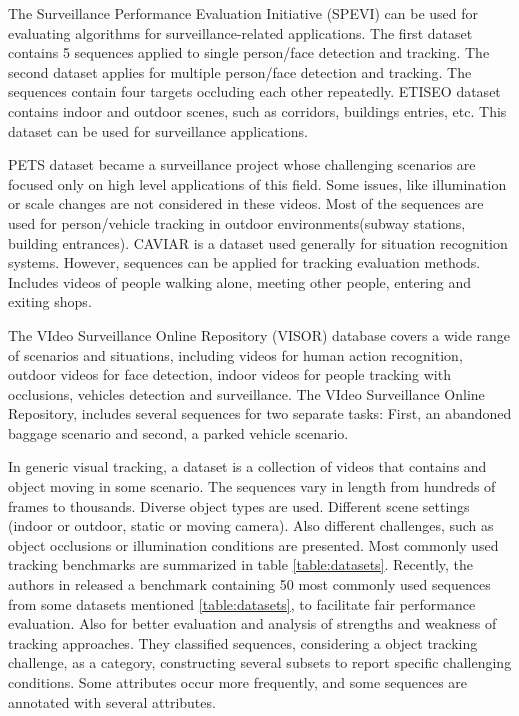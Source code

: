 The Surveillance Performance Evaluation Initiative (SPEVI) can be used for evaluating algorithms for surveillance-related applications. The first dataset contains 5 sequences applied to single person/face detection and tracking. The second dataset applies for multiple person/face detection and tracking. The sequences contain four targets occluding each other repeatedly. ETISEO dataset contains indoor and outdoor scenes, such as corridors, buildings entries, etc. This dataset can be used for surveillance applications.

PETS dataset became a surveillance project whose challenging scenarios are focused only on high level applications of this field. Some issues, like illumination or scale changes are not considered in these videos. Most of the sequences are used for person/vehicle tracking in outdoor environments(subway stations, building entrances). CAVIAR is a dataset used generally for situation recognition systems. However, sequences can be applied for tracking evaluation methods. Includes videos of people walking alone, meeting other people, entering and exiting shops.

The VIdeo Surveillance Online Repository (VISOR) database covers a wide range of scenarios and situations, including videos for human action recognition, outdoor videos for face detection, indoor videos for people tracking with occlusions, vehicles detection and surveillance. The VIdeo Surveillance Online Repository, includes several sequences for two separate tasks: First, an abandoned baggage scenario and second, a parked vehicle scenario.

In generic visual tracking, a dataset is a collection of videos that contains and object moving in some scenario. The sequences vary in length from hundreds of frames to thousands. Diverse object types are used. Different scene settings (indoor or outdoor, static or moving camera). Also different challenges, such as object occlusions or illumination conditions are presented. Most commonly used tracking benchmarks are summarized in table \ref{table:datasets}.  Recently, the authors in \cite{Wu2013b} released a benchmark containing 50 most commonly used sequences from some datasets mentioned \ref{table:datasets}, to facilitate fair performance evaluation. Also for better evaluation and analysis of strengths and weakness of tracking approaches. They classified sequences, considering a object tracking challenge, as a category, constructing several subsets to report specific challenging conditions. Some attributes occur more frequently, and some sequences are annotated with several attributes.

